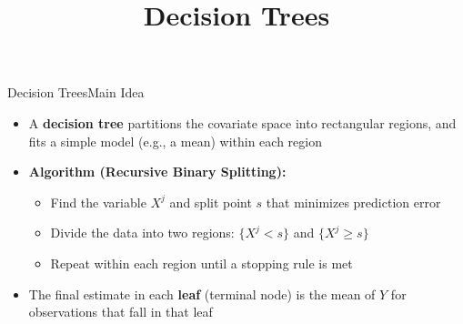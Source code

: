 \documentclass[hyperref={pdfpagelabels=false}]{beamer}
\begin{document}
\title[]
{Decision Trees}

\author{}
\institute{}
\date{}

\begin{frame}{}
	\titlepage
\end{frame}




\begin{frame}{Decision Trees}{Main Idea}
	\begin{itemize}
		\item A \textbf{decision tree} partitions the covariate space into rectangular regions, and fits a simple model (e.g., a mean) within each region
		\vspace{0.3cm}
		\item \textbf{Algorithm (Recursive Binary Splitting):}
		\vspace{0.2cm}
		\begin{itemize}
			\item[1] Find the variable $X^j$ and split point $s$ that minimizes prediction error
			\vspace{0.2cm}
			\item[2] Divide the data into two regions: $\{X^j < s\}$ and $\{X^j \geq s\}$
			\vspace{0.2cm}
			\item[3] Repeat within each region until a stopping rule is met
		\end{itemize}
		\vspace{0.3cm}
		\item The final estimate in each \textbf{leaf} (terminal node) is the mean of $Y$ for observations that fall in that leaf
	\end{itemize}
\end{frame}
\end{document}
